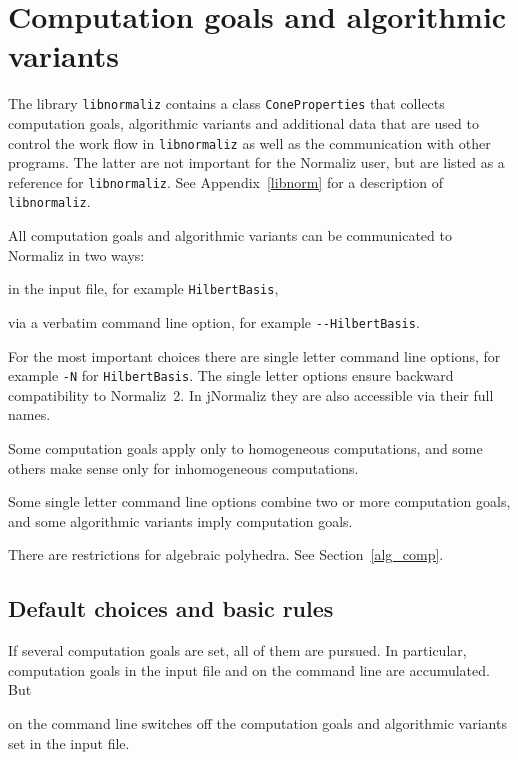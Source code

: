 
\section{Computation goals and algorithmic variants}\label{Goals}

The library \verb|libnormaliz| contains a class \verb|ConeProperties| that collects computation goals, algorithmic variants and additional data that are used to control the work flow in \verb|libnormaliz| as well as the communication with other programs. The latter are not important for the Normaliz user, but are listed as a reference for \verb|libnormaliz|. See Appendix~\ref{libnorm} for a description of \verb|libnormaliz|.

All computation goals and algorithmic variants can be communicated to Normaliz in two ways:
\begin{arab}
	\item in the input file, for example \verb|HilbertBasis|,
	\item via a verbatim command line option, for example \verb|--HilbertBasis|.
\end{arab}
For the most important choices there are single letter command line options, for example \verb|-N| for \verb|HilbertBasis|. The single letter options ensure backward compatibility to Normaliz~2. In jNormaliz they are also accessible via their full names.

Some computation goals apply only to homogeneous computations, and some others make sense only for inhomogeneous computations.

Some single letter command line options combine two or more computation goals, and some algorithmic variants imply computation goals.

There are restrictions for algebraic polyhedra. See Section~\ref{alg_comp}.

\subsection{Default choices and basic rules}

If several computation goals are set, all of them are pursued. In particular, computation goals in the input file and on the command line are accumulated. But
\begin{itemize}
	\itemtt[-{}-ignore, -i] on the command line switches off the computation goals and algorithmic variants set in the input file.
\end{itemize}

